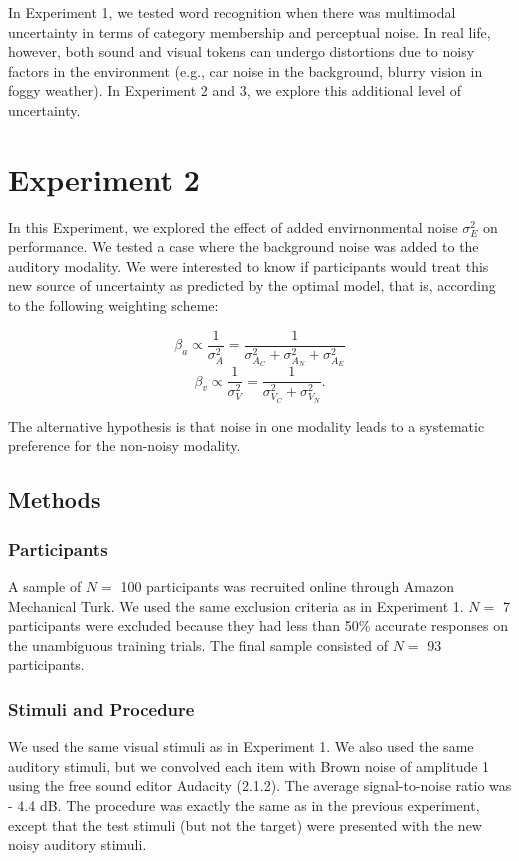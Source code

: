 \documentclass[english,,man,floatsintext]{apa6}
\theoremstyle{definition}
\theoremstyle{definition}
\theoremstyle{definition}
\theoremstyle{remark}
\begin{document}
In Experiment 1, we tested word recognition when there was multimodal
uncertainty in terms of category membership and perceptual noise. In
real life, however, both sound and visual tokens can undergo distortions
due to noisy factors in the environment (e.g., car noise in the
background, blurry vision in foggy weather). In Experiment 2 and 3, we
explore this additional level of uncertainty.

\section{Experiment 2}\label{experiment-2}

In this Experiment, we explored the effect of added envirnonmental noise
\(\sigma^2_{E}\) on performance. We tested a case where the background
noise was added to the auditory modality. We were interested to know if
participants would treat this new source of uncertainty as predicted by
the optimal model, that is, according to the following weighting scheme:

\[\beta_a \propto \frac{1}{\sigma^2_{A}} = \frac{1}{\sigma^2_{A_C}+\sigma^2_{A_N} + \sigma^2_{A_E}}\]
\[\beta_v \propto \frac{1}{\sigma^2_{V}} = \frac{1}{\sigma^2_{V_C}+\sigma^2_{V_N}}.\]

The alternative hypothesis is that noise in one modality leads to a
systematic preference for the non-noisy modality.

\subsection{Methods}\label{methods-1}

\subsubsection{Participants}\label{participants-1}

A sample of \(N =\) 100 participants was recruited online through Amazon
Mechanical Turk. We used the same exclusion criteria as in Experiment 1.
\(N =\) 7 participants were excluded because they had less than 50\%
accurate responses on the unambiguous training trials. The final sample
consisted of \(N =\) 93 participants.

\subsubsection{Stimuli and Procedure}\label{stimuli-and-procedure}

We used the same visual stimuli as in Experiment 1. We also used the
same auditory stimuli, but we convolved each item with Brown noise of
amplitude 1 using the free sound editor Audacity (2.1.2). The average
signal-to-noise ratio was - 4.4 dB. The procedure was exactly the same
as in the previous experiment, except that the test stimuli (but not the
target) were presented with the new noisy auditory stimuli.
\end{document}
